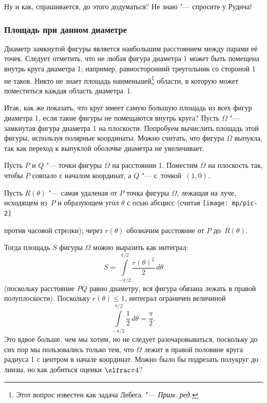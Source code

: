 \documentclass[twoside]{book}
\begin{document}
\medskip
Ну и как, спрашивается, до этого додуматься?
Не  знаю "--- спросите у Рудича!

\subsubsection*{Площадь при данном диаметре}



\medskip

Диаметр замкнутой фигуры является наибольшим расстоянием между парами её
точек.
Следует отметить, что не любая фигура диаметра 1 может быть
помещена внутрь круга диаметра 1; например, равносторонний треугольник
со стороной 1 не таков.
Никто не знает площадь наименьшей\footnote{Этот вопрос известен как задача Лебега. "--- \emph{Прим. ред.}} области, в
которую может поместиться каждая область диаметра~1.

Итак, как же показать, что круг имеет самую большую площадь из всех
фигур диаметра 1, если такие фигуры не помещаются внутрь круга?  Пусть
$\Omega$ "--- замкнутая фигура диаметра 1 на плоскости.
Попробуем
вычислить площадь этой фигуры, используя полярные координаты.
Можно
считать, что фигура $\Omega$ выпукла, так как переход к выпуклой
оболочке диаметра не увеличивает.

Пусть $P$ и $Q$ "--- точки фигуры $\Omega$ на расстоянии 1.
Поместим
$\Omega$ на плоскость так, чтобы $P$ совпало с началом координат, а
$Q$ "--- с~точкой~$(1,0)$.


Пусть $R(\theta)$ "--- 
самая удаленая от $P$ точка фигуры $\Omega$, лежащая на луче, исходящем
из~$P$ и образующем угол $\theta$ с осью абсцисс (считая
%
\hbox{\texttt{[image: mp/pic-2]}}
\begin{figure}
\vspace{-\jot}
\centering
{}
\end{figure}
%
против часовой
стрелки); через $r(\theta)$ обозначим расстояние от $P$ до~$R(\theta)$.

Тогда площадь $S$ фигуры $\Omega$ можно выразить как интеграл:
\[S=\int\limits_{-\pi/2}^{\pi/2}\frac{r(\theta)^2}{2}\,d\theta\]
(поскольку расстояние $PQ$ равно диаметру, вся фигура обязана лежать в
правой полуплоскости).
Поскольку $r(\theta) \le 1$, интеграл ограничен величиной
\[\int\limits_{-\pi/2}^{\pi/2}\frac{1}{2}\,d\theta=\frac\pi2.\]
Это вдвое больше, чем мы хотим, но не следует разочаровываться,
поскольку до сих пор мы пользовались только тем, что $\Omega$ лежит в
правой половине круга радиуса 1 с центром в начале координат. 
Можно было бы подрезать полукруг до линзы, но как добиться оценки $\slfrac\pi4$?
\end{document}
